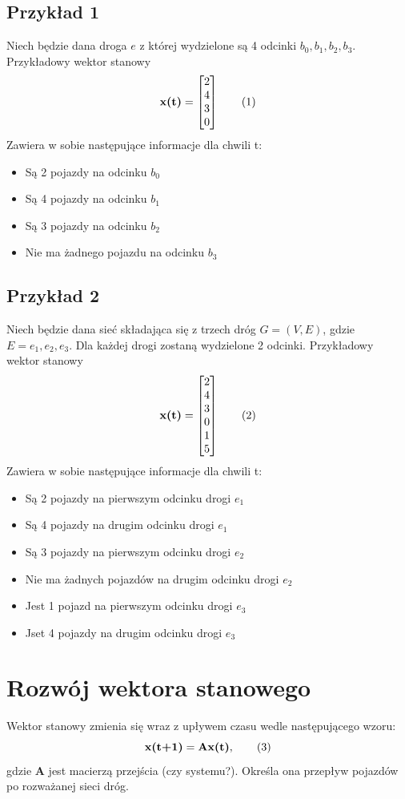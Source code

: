 \documentclass[12pt]{book}
\theoremstyle{plain}
\newcommand\addtag{\refstepcounter{equation}
\renewcommand{\labelenumii}{\theenumii}
\renewcommand{\theenumii}{\theenumi.\arabic{enumii}.}
\tag{\theequation}}
\begin{document}
\subsection{Przykład 1}
Niech będzie dana droga $e$ z której wydzielone są 4 odcinki ${b_0,b_1,b_2,b_3}$. Przykładowy wektor stanowy
\[\textbf{x(t)}=\begin{bmatrix}
2 \\ 4 \\ 3 \\ 0
\end{bmatrix} \addtag \]
Zawiera w sobie następujące informacje dla chwili t:
\begin{itemize}
	\item Są 2 pojazdy na odcinku $b_0$
	\item Są 4 pojazdy na odcinku $b_1$
	\item Są 3 pojazdy na odcinku $b_2$
	\item Nie ma żadnego pojazdu na odcinku $b_3$
\end{itemize}
\subsection{Przykład 2}
Niech będzie dana sieć składająca się z trzech dróg $G=(V,E)$, gdzie $E={e_1,e_2,e_3}$. Dla każdej drogi zostaną wydzielone 2 odcinki. Przykładowy wektor stanowy
\[\textbf{x(t)}=\begin{bmatrix}
2 \\ 4 \\ 3 \\ 0 \\ 1 \\ 5
\end{bmatrix} \addtag \]
Zawiera w sobie następujące informacje dla chwili t:
\begin{itemize}
	\item Są 2 pojazdy na pierwszym odcinku drogi $e_1$
	\item Są 4 pojazdy na drugim odcinku drogi $e_1$
	\item Są 3 pojazdy na pierwszym odcinku drogi $e_2$
	\item Nie ma żadnych pojazdów na drugim odcinku drogi $e_2$
	\item Jest 1 pojazd na pierwszym odcinku drogi $e_3$
	\item Jset 4 pojazdy na drugim odcinku drogi $e_3$
\end{itemize}
\section{Rozwój wektora stanowego}
Wektor stanowy zmienia się wraz z upływem czasu wedle następującego wzoru:
\[\textbf{x(t+1)}=\textbf{Ax(t)}, \addtag \label{eq:Ax} \]
gdzie $\textbf{A}$ jest macierzą przejścia (czy systemu?). Określa ona przepływ pojazdów po rozważanej sieci dróg.
\end{document}
